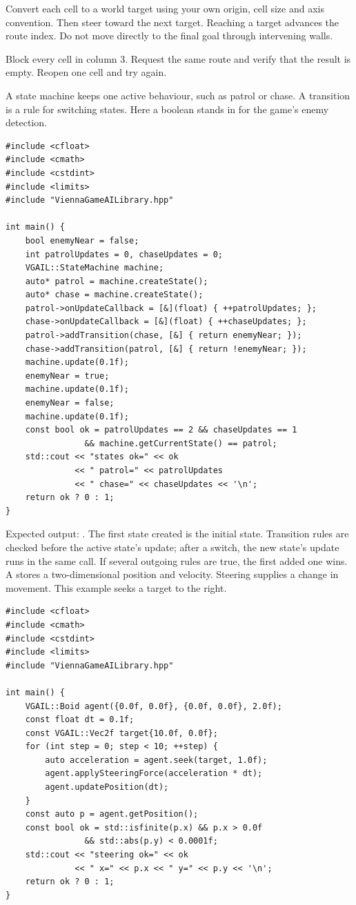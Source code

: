 \documentclass[11pt,a4paper]{article}
\begin{document}
Convert each cell to a world target using your own origin, cell size and axis convention. Then steer toward the next target. Reaching a target advances the route index. Do not move directly to the final goal through intervening walls.

\begin{tryit}Block every cell in column 3. Request the same route and verify that the result is empty. Reopen one cell and try again.\end{tryit}
A state machine keeps one active behaviour, such as patrol or chase. A transition is a rule for switching states. Here a boolean stands in for the game's enemy detection.%
\begin{lstlisting}
#include <cfloat>
#include <cmath>
#include <cstdint>
#include <limits>
#include "ViennaGameAILibrary.hpp"

int main() {
    bool enemyNear = false;
    int patrolUpdates = 0, chaseUpdates = 0;
    VGAIL::StateMachine machine;
    auto* patrol = machine.createState();
    auto* chase = machine.createState();
    patrol->onUpdateCallback = [&](float) { ++patrolUpdates; };
    chase->onUpdateCallback = [&](float) { ++chaseUpdates; };
    patrol->addTransition(chase, [&] { return enemyNear; });
    chase->addTransition(patrol, [&] { return !enemyNear; });
    machine.update(0.1f);
    enemyNear = true;
    machine.update(0.1f);
    enemyNear = false;
    machine.update(0.1f);
    const bool ok = patrolUpdates == 2 && chaseUpdates == 1
                && machine.getCurrentState() == patrol;
    std::cout << "states ok=" << ok
              << " patrol=" << patrolUpdates
              << " chase=" << chaseUpdates << '\n';
    return ok ? 0 : 1;
}
\end{lstlisting}
Expected output: . The first state created is the initial state. Transition rules are checked before the active state's update; after a switch, the new state's update runs in the same call. If several outgoing rules are true, the first added one wins.
A  stores a two-dimensional position and velocity. Steering supplies a change in movement. This example seeks a target to the right.%
\begin{lstlisting}
#include <cfloat>
#include <cmath>
#include <cstdint>
#include <limits>
#include "ViennaGameAILibrary.hpp"

int main() {
    VGAIL::Boid agent({0.0f, 0.0f}, {0.0f, 0.0f}, 2.0f);
    const float dt = 0.1f;
    const VGAIL::Vec2f target{10.0f, 0.0f};
    for (int step = 0; step < 10; ++step) {
        auto acceleration = agent.seek(target, 1.0f);
        agent.applySteeringForce(acceleration * dt);
        agent.updatePosition(dt);
    }
    const auto p = agent.getPosition();
    const bool ok = std::isfinite(p.x) && p.x > 0.0f
                && std::abs(p.y) < 0.0001f;
    std::cout << "steering ok=" << ok
              << " x=" << p.x << " y=" << p.y << '\n';
    return ok ? 0 : 1;
}
\end{lstlisting}
\end{document}
